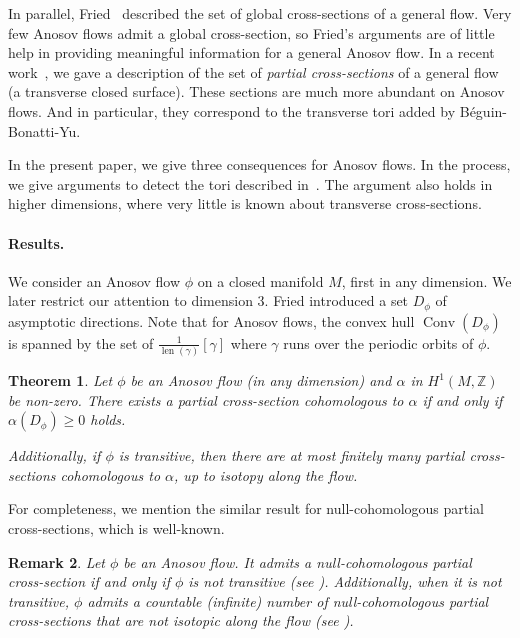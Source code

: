 \documentclass[colorinlistoftodos,12pt]{article}
\newcommand{\ZZ}{\mathbb{Z}}
\DeclareMathOperator{\len}{len}
\DeclareMathOperator{\conv}{Conv}
\theoremstyle{colorplain}
\numberwithin{theorem}{section}
\newtheorem{maintheorem}{Theorem}
\theoremstyle{colorremarkbis}
\theoremstyle{colorremark}
\newtheorem{mainremark}[maintheorem]{Remark}
\theoremstyle{colordefinition}
\begin{document}
In parallel, Fried~\cite{Fried82} described the set of global cross-sections of a general flow. Very few Anosov flows admit a global cross-section, so Fried's arguments are of little help in providing meaningful information for a general Anosov flow. In a recent work~\cite{marty2025partialI,marty2025partialII}, we gave a description of the set of \emph{partial cross-sections} of a general flow (a transverse closed surface). These sections are much more abundant on Anosov flows. And in particular, they correspond to the transverse tori added by Béguin-Bonatti-Yu. 

In the present paper, we give three consequences for Anosov flows. In the process, we give arguments to detect the tori described in~\cite{beguin2016spectral}. The argument also holds in higher dimensions, where very little is known about transverse cross-sections.

\paragraph{Results.} We consider an Anosov flow $\phi$ on a closed manifold $M$, first in any dimension. We later restrict our attention to dimension 3. Fried \cite{Fried82} introduced a set $D_\phi$ of asymptotic directions. Note that for Anosov flows, the convex hull $\conv(D_\phi)$ is spanned by the set of $\frac{1}{\len(\gamma)}[\gamma]$ where $\gamma$ runs over the periodic orbits of $\phi$.


\begin{maintheorem}\label{thm-cross-section}
	Let $\phi$ be an Anosov flow (in any dimension) and $\alpha$ in $H^1(M,\ZZ)$ be non-zero. There exists a partial cross-section cohomologous to $\alpha$ if and only if $\alpha(D_\phi)\geq 0$ holds. 
	
	Additionally, if $\phi$ is transitive, then there are at most finitely many partial cross-sections cohomologous to $\alpha$, up to isotopy along the flow.
\end{maintheorem}

For completeness, we mention the similar result for null-cohomologous partial cross-sections, which is well-known.

\begin{mainremark}
	Let $\phi$ be an Anosov flow. It admits a null-cohomologous partial cross-section if and only if $\phi$ is not transitive (see \cite{smale1967differentiable}). Additionally, when it is not transitive, $\phi$ admits a countable (infinite) number of null-cohomologous partial cross-sections that are not isotopic along the flow (see \cite[Theorem~4.3]{marty2025partialII}).
\end{mainremark}
\end{document}
